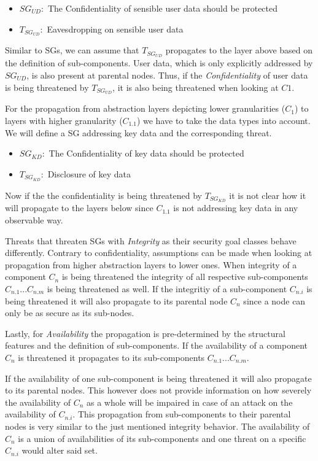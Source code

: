 \begin{itemize}
\item[]\textbf{$SG_{UD}:$} The Confidentiality of sensible user data should be protected
\item[]\textbf{$T_{SG_{UD}}:$} Eavesdropping on sensible user data
\end{itemize}

Similar to SGs, we can assume that $T_{SG_{UD}}$ propagates to the layer above based on the definition of sub-components. User data, which is only explicitly addressed by $SG_{UD}$, is also present at parental nodes. Thus, if the \textit{Confidentiality} of user data is being threatened by $T_{SG_{UD}}$, it is also being threatened when looking at $C1$.

For the propagation from abstraction layers depicting lower granularities ($C_1$) to layers with higher granularity ($C_{1.1}$) we have to take the data types into account. We will define a SG addressing key data and the corresponding threat.

\begin{itemize}
\item[]\textbf{$SG_{KD}:$} The Confidentiality of key data should be protected
\item[]\textbf{$T_{SG_{KD}}:$} Disclosure of key data
\end{itemize}

Now if the the confidentiality is being threatened by $T_{SG_{KD}}$ it is not clear how it will propagate to the layers below since $C_{1.1}$ is not addressing key data in any observable way. 

Threats that threaten SGs with \textit{Integrity} as their security goal classes behave differently. Contrary to confidentiality, assumptions can be made when looking at propagation from higher abstraction layers to lower ones. When integrity of a component $C_n$ is being threatened the integrity of all respective sub-components $C_{n.1} ... C_{n.m}$ is being threatened as well. If the integritiy of a sub-component $C_{n.i}$ is being threatened it will also propagate to its parental node $C_n$ since a node can only be as secure as its sub-nodes.

Lastly, for \textit{Availability} the propagation is pre-determined by the structural features and the definition of sub-components. If the availability of a component $C_n$ is threatened it propagates to its sub-components $C_{n.1} ... C_{n.m}$. 

If the availability of one sub-component is being threatened it will also propagate to its parental nodes. This however does not provide information on how severely the availability of $C_n$ as a whole will be impaired in case of an attack on the availability of $C_{n.i}$. This propagation from sub-components to their parental nodes is very similar to the just mentioned integrity behavior. The availability of $C_n$ is a union of availabilities of its sub-components and one threat on a specific $C_{n.i}$ would alter said set.

